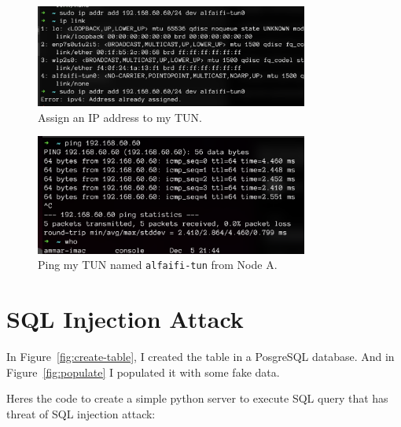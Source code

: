 \documentclass{article}
\def\c#1{\texttt{#1}}
\begin{document}
\begin{figure}[!hb]
	\centering
	\includegraphics[width=0.8\textwidth]{./figures/assign-addr.png}
	\caption{Assign an IP address to my TUN.}
	\label{fig:assign-addr}
\end{figure}

\begin{figure}[!hb]
	\centering
	\includegraphics[width=0.8\textwidth]{./figures/ping-tun.png}
	\caption{Ping my TUN named \c{alfaifi-tun} from Node A.}
	\label{fig:ping-tun}
\end{figure}

\section{SQL Injection Attack} %
\label{sec:SQL Injection Attack}
In Figure~\ref{fig:create-table}, I created the table in a PosgreSQL database. And in Figure~\ref{fig:populate}
I populated it with some fake data.

Heres the code to create a simple python server to execute SQL query that has
threat of SQL injection attack:
\end{document}
